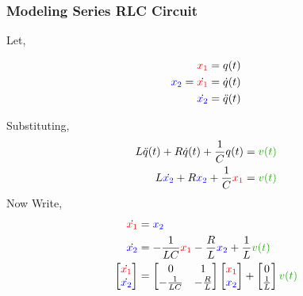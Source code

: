 \documentclass[hyperref={pdfpagelabels=true}]{beamer}
\begin{document}
\begin{frame}[shrink]
\frametitle{Modeling {\large Series RLC Circuit}} 
\begin{center}
 \begin{tcolorbox}[title=State Space Representation,width=10 cm]
{
Let,
\begin{center}
\begin{align*}
\textcolor{red}{x_1} &= q(t) \\
\textcolor{blue}{x_2}=\dot{\textcolor{red}{x_1}} &=\dot{q}(t) \\
\dot{\textcolor{blue}{x_2}} &=\ddot{q}(t) 
\end{align*} \end{center}
 Substituting, 
\begin{align*}
L\ddot{q}(t) + R\dot{q}(t) + \frac{1}{C}q(t) &= \textcolor{mygreen}{v(t)} \\
L\dot{\textcolor{blue}{x_2}} + R\textcolor{blue}{x_2} + \frac{1}{C}\textcolor{red}{x_1} &=  \textcolor{mygreen}{v(t)}
\end{align*}
Now Write,
\begin{align*}
\dot{\textcolor{red}{x_1}}&=\textcolor{blue}{x_2} \\
\dot{\textcolor{blue}{x_2}}&=-\frac{1}{LC}\textcolor{red}{x_1}-\frac{R}{L}\textcolor{blue}{x_2}+\frac{1}{L} \textcolor{mygreen}{v(t)} \\
\begin{bmatrix}
\dot{\textcolor{red}{x_1}} \\
\dot{\textcolor{blue}{x_2}}
\end{bmatrix}
&=\begin{bmatrix}
    0     & 1 \\
   -\frac{1}{LC}     &-\frac{R}{L} \\
\end{bmatrix}
\begin{bmatrix}
\textcolor{red}{x_1} \\
\textcolor{blue}{x_2}
\end{bmatrix}+
\begin{bmatrix}
0 \\ \frac{1}{L}
\end{bmatrix}\textcolor{mygreen}{v(t)}
\end{align*}
}
\end{tcolorbox}
\end{center}
\end{frame}
\end{document}
